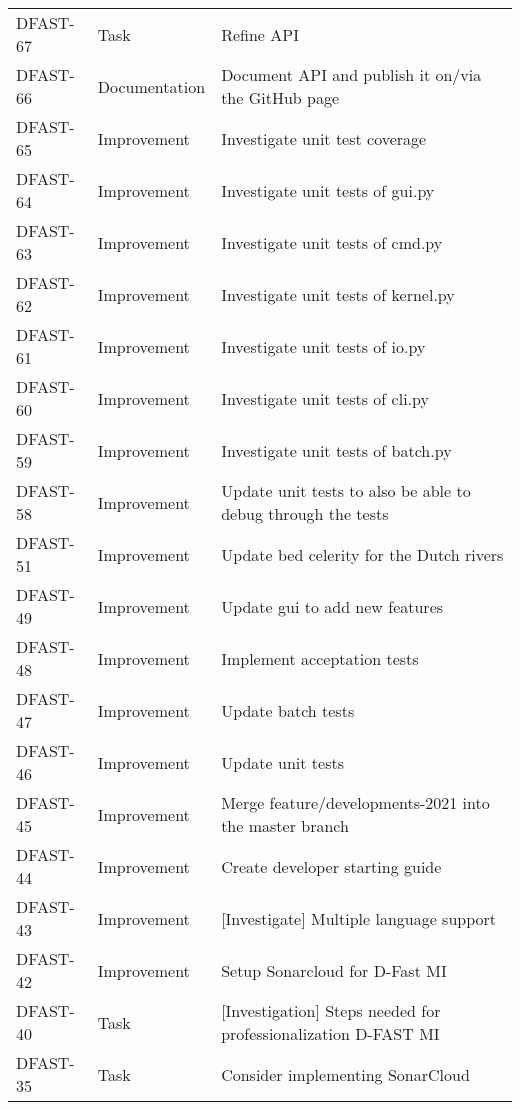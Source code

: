 \documentclass[git]{deltares_manual}
\begin{document}
\begin{longtable}{l|l|p{8cm}}
DFAST-67 & Task & Refine API \\
DFAST-66 & Documentation & Document API and publish it on/via the GitHub page \\
DFAST-65 & Improvement & Investigate unit test coverage \\
DFAST-64 & Improvement & Investigate unit tests of gui.py \\
DFAST-63 & Improvement & Investigate unit tests of cmd.py \\
DFAST-62 & Improvement & Investigate unit tests of kernel.py \\
DFAST-61 & Improvement & Investigate unit tests of io.py \\
DFAST-60 & Improvement &  Investigate unit tests of cli.py \\
DFAST-59 & Improvement & Investigate unit tests of batch.py \\
DFAST-58 & Improvement & Update unit tests to also be able to debug through the tests \\
DFAST-51 & Improvement & Update bed celerity for the Dutch rivers \\
DFAST-49 & Improvement & Update gui to add new features \\
DFAST-48 & Improvement & Implement acceptation tests \\
DFAST-47 & Improvement & Update batch tests \\
DFAST-46 & Improvement & Update unit tests \\
DFAST-45 & Improvement & Merge feature/developments-2021 into the master branch \\
DFAST-44 & Improvement & Create developer starting guide \\
DFAST-43 & Improvement & [Investigate] Multiple language support \\
DFAST-42 & Improvement & Setup Sonarcloud for D-Fast MI \\
DFAST-40 & Task & [Investigation] Steps needed for professionalization D-FAST MI \\
DFAST-35 & Task & Consider implementing SonarCloud  \\
\end{longtable}

\pagestyle{empty}
\cleardoublepage
\mbox{}
\end{document}

